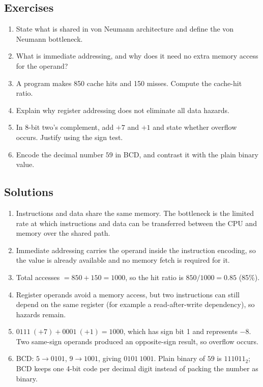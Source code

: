 \subsection*{Exercises}
\begin{enumerate}[label=\arabic*.]
  \item State what is shared in von Neumann architecture and define the von
    Neumann bottleneck.
  \item What is immediate addressing, and why does it need no extra memory
    access for the operand?
  \item A program makes 850 cache hits and 150 misses. Compute the
    cache-hit ratio.
  \item Explain why register addressing does not eliminate all data hazards.
  \item In 8-bit two's complement, add $+7$ and $+1$ and state whether
    overflow occurs. Justify using the sign test.
  \item Encode the decimal number $59$ in BCD, and contrast it with the plain
    binary value.
\end{enumerate}

\subsection*{Solutions}
\begingroup\small
\begin{enumerate}[label=\arabic*.]
  \item Instructions and data share the same memory. The bottleneck is the
    limited rate at which instructions and data can be transferred between
    the CPU and memory over the shared path.
  \item Immediate addressing carries the operand inside the instruction
    encoding, so the value is already available and no memory fetch is
    required for it.
  \item Total accesses $=850+150=1000$, so the hit ratio is
    $850/1000 = 0.85$ (85\%).
  \item Register operands avoid a memory access, but two instructions can
    still depend on the same register (for example a read-after-write
    dependency), so hazards remain.
  \item $0111\ (+\!7) + 0001\ (+\!1) = 1000$, which has sign bit 1 and
    represents $-8$. Two same-sign operands produced an opposite-sign
    result, so overflow occurs.
  \item BCD: $5 \rightarrow 0101$, $9 \rightarrow 1001$, giving
    $0101\ 1001$. Plain binary of $59$ is $111011_2$; BCD keeps one 4-bit
    code per decimal digit instead of packing the number as binary.
\end{enumerate}
\endgroup

